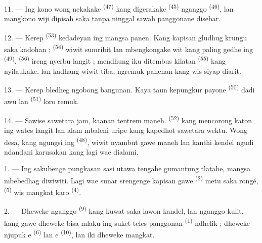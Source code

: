 11. --- Ing kono wong nekakake 
\textsuperscript{(47)} kang digerakake 
\textsuperscript{(45)} nganggo 
\textsuperscript{(46)}, lan mangkono wiji dipisah saka 
tanpa ninggal sawah panggonane disebar.

\VUsaut{5.0mm}
\VUsaut{3.4mm}

12. --- Kerep  \textsuperscript{(53)} kedadeyan ing
mangsa panen. Kang kapisan gludhug krungu saka kadohan ;
 \textsuperscript{(54)} wiwit sumribit lan
mbengkongake wit kang paling gedhe ing 
\textsuperscript{(49)}.  \textsuperscript{(56)} ireng
nyerbu langit ; mendhung iku ditembus kilatan 
\textsuperscript{(55)} kang nyilaukake.  lan kadhang
 wiwit tiba, ngremuk panenan kang wis siyap diarit.

13. --- Kerep bledheg ngobong bangunan. Kaya taun kepungkur payone
 \textsuperscript{(50)} dadi awu lan 
\textsuperscript{(51)} loro remuk.

14. --- Sawise sawetara jam, kaanan tentrem maneh. 
\textsuperscript{(52)} kang mencorong katon ing wates langit lan alam
mbaleni uripe kang kapedhot sawetara wektu. Wong desa, kang ngungsi
ing  \textsuperscript{(48)}, wiwit nyambut gawe maneh lan
kanthi kendel ngudi ndandani karusakan kang lagi wae dialami.

\VUsaut{6.0mm}
\VUsaut{3.6mm}

\VUsaut{1.4mm}
\VUsaut{4.0mm}

1. --- Ing sakubenge pungkasan sasi  utawa tengahe
 gumantung tlatahe, mangsa mbebedhag diwiwiti. Lagi
wae sunar srengenge kapisan gawe  \textsuperscript{(2)}
metu saka rongé,  \textsuperscript{(5)} wis
mangkat karo  \textsuperscript{(4)}.

2. --- Dheweke nganggo 
\textsuperscript{(9)} kang kuwat saka lawon kandel, lan nganggo
 kulit, kang gawe dheweke bisa mlaku ing suket
teles panggonan  \textsuperscript{(1)} ndhelik ; dheweke
njupuk e \textsuperscript{(6)} lan e
\textsuperscript{(10)}, lan iki dheweke mangkat.


